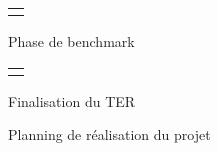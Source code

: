 \begin{landscape}
\begin{figure}[h!]
\hspace{7.3cm} \noindent \begin{tabular}{l}
    \rowcolor{red} \\  
\end{tabular}
Phase de benchmark

\hspace{7.3cm} \noindent \begin{tabular}{l}
     \rowcolor{yellow} \\  
\end{tabular}
Finalisation du TER \\
\caption{Planning de réalisation du projet}
\end{figure}

\end{landscape}